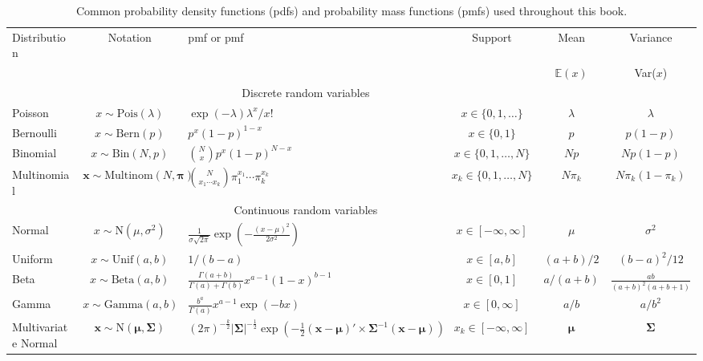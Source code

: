 \begin{table}%
  \caption{Common probability density functions (pdfs) and probability
    mass functions (pmfs) used throughout this book.}
  \begin{tabular}[t]{lcp{4.4cm}ccc}
    \hline
    Distribution & Notation & pmf or pmf & Support & Mean & Variance  \\
                 & & & & $\mathbb{E}(x)$ & Var($x$) \\
    \hline
    \multicolumn{5}{c}{Discrete random variables} \\
    Poisson & $x \sim \text{Pois}(\lambda)$ &
    $\exp(-\lambda)\lambda^x/x!$ & $x \in \{0,1,\ldots\}$ & $\lambda$ & $\lambda$ \\
    Bernoulli & $x \sim \text{Bern}(p)$ & $p^x(1-p)^{1-x}$ & $x \in \{0,1\}$ & $p$ &
    $p(1-p)$  \\
    Binomial & $x \sim \text{Bin}(N, p)$ & $\binom{N}{x}p^x(1-p)^{N-x}$
    & $x \in \{0,1,\ldots,N\}$ & $Np$ & $Np(1-p)$  \\
    Multinomial & $\mathbf{x} \sim \text{Multinom}(N, \bm{\pi})$ &
    $\binom{N}{x_1 \cdots x_k}\pi_1^{x_1} \cdots \pi_k^{x_k}$ & $x_k
    \in \{0,1,\ldots,N\}$ & $N\pi_k$ & $N\pi_k(1-\pi_k)$ \\
    \multicolumn{5}{c}{Continuous random variables} \\
    Normal & $x \sim \text{N}(\mu, \sigma^2)$ & $\frac{1}{\sigma\sqrt{2\pi}}
      \exp(-\frac{(x-\mu)^2}{2\sigma^2})$ & $x \in [-\infty,\infty]$ & $\mu$ & $\sigma^2$  \\
    Uniform & $x \sim \text{Unif}(a, b)$ & $1/(b-a)$ & $x \in [a,b]$ & $(a+b)/2$ &
    $(b-a)^2/12$  \\
    Beta & $x \sim \text{Beta}(a, b)$ &
    $\frac{\Gamma(a+b)}{\Gamma(a)+\Gamma(b)}x^{a-1}
    (1-x)^{b-1}$ & $x \in [0,1]$ & $a/(a+b)$ & $\frac{ab}{(a+b)^2(a+b+1)}$ \\
    Gamma & $x \sim \text{Gamma}(a,b)$ &
    $\frac{b^a}{\Gamma(a)}x^{a-1}\exp(-bx)$ & $x\in [0,\infty]$ & $a/b$ & $a/b^2$  \\
    Multivariate Normal & $\mathbf{x} \sim \text{N}(\bm{\mu}, \bm{\Sigma})$ &
    $(2\pi)^{-\frac{k}{2}}|\bm{\Sigma}|^{-\frac{1}{2}}\exp(-\frac{1}{2}(\mathbf{x}-\bm{\mu})'\times\bm{\Sigma}^{-1}(\mathbf{x}-\bm{\mu}))$
    & $x_k \in [-\infty,\infty]$ & $\bm{\mu}$ & $\bm{\Sigma}$ \\
    \hline
  \end{tabular}
  \label{modeling.tab.pdfs}
\end{table}




